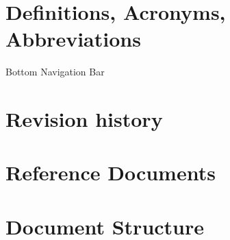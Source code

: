 \section{Definitions, Acronyms, Abbreviations}
Bottom Navigation Bar
\section{Revision history}
\section{Reference Documents}
\section{Document Structure}
